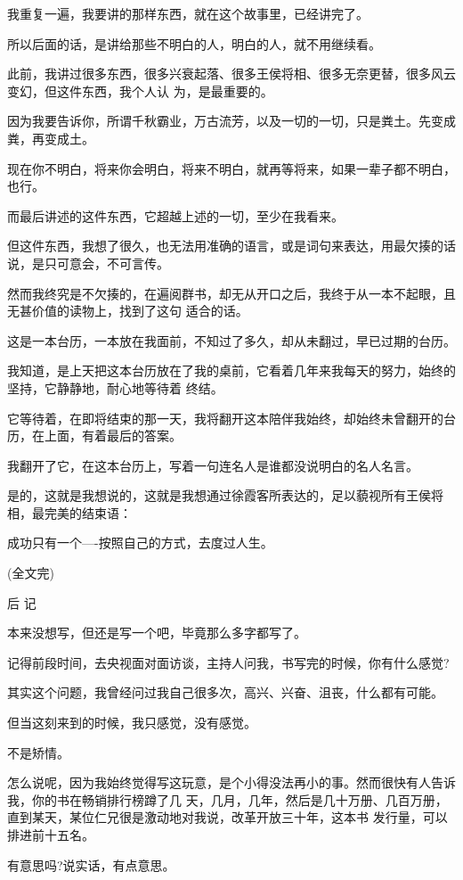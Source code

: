 \documentclass[11pt,a4paper,onecolumn]{article}
\begin{document}
我重复一遍，我要讲的那样东西，就在这个故事里，已经讲完了。

所以后面的话，是讲给那些不明白的人，明白的人，就不用继续看。

此前，我讲过很多东西，很多兴衰起落、很多王侯将相、很多无奈更替，很多风云变幻，但这件东西，我个人认
为，是最重要的。

因为我要告诉你，所谓千秋霸业，万古流芳，以及一切的一切，只是粪土。先变成粪，再变成土。

现在你不明白，将来你会明白，将来不明白，就再等将来，如果一辈子都不明白，也行。

而最后讲述的这件东西，它超越上述的一切，至少在我看来。

但这件东西，我想了很久，也无法用准确的语言，或是词句来表达，用最欠揍的话说，是只可意会，不可言传。

然而我终究是不欠揍的，在遍阅群书，却无从开口之后，我终于从一本不起眼，且无甚价值的读物上，找到了这句
适合的话。

这是一本台历，一本放在我面前，不知过了多久，却从未翻过，早已过期的台历。

我知道，是上天把这本台历放在了我的桌前，它看着几年来我每天的努力，始终的坚持，它静静地，耐心地等待着
终结。

它等待着，在即将结束的那一天，我将翻开这本陪伴我始终，却始终未曾翻开的台历，在上面，有着最后的答案。

我翻开了它，在这本台历上，写着一句连名人是谁都没说明白的名人名言。

是的，这就是我想说的，这就是我想通过徐霞客所表达的，足以藐视所有王侯将相，最完美的结束语：

成功只有一个----按照自己的方式，去度过人生。

(全文完)

后 记

本来没想写，但还是写一个吧，毕竟那么多字都写了。

记得前段时间，去央视面对面访谈，主持人问我，书写完的时候，你有什么感觉?

其实这个问题，我曾经问过我自己很多次，高兴、兴奋、沮丧，什么都有可能。

但当这刻来到的时候，我只感觉，没有感觉。

不是矫情。

怎么说呢，因为我始终觉得写这玩意，是个小得没法再小的事。然而很快有人告诉我，你的书在畅销排行榜蹲了几
天，几月，几年，然后是几十万册、几百万册，直到某天，某位仁兄很是激动地对我说，改革开放三十年，这本书
发行量，可以排进前十五名。

有意思吗?说实话，有点意思。
\end{document}
